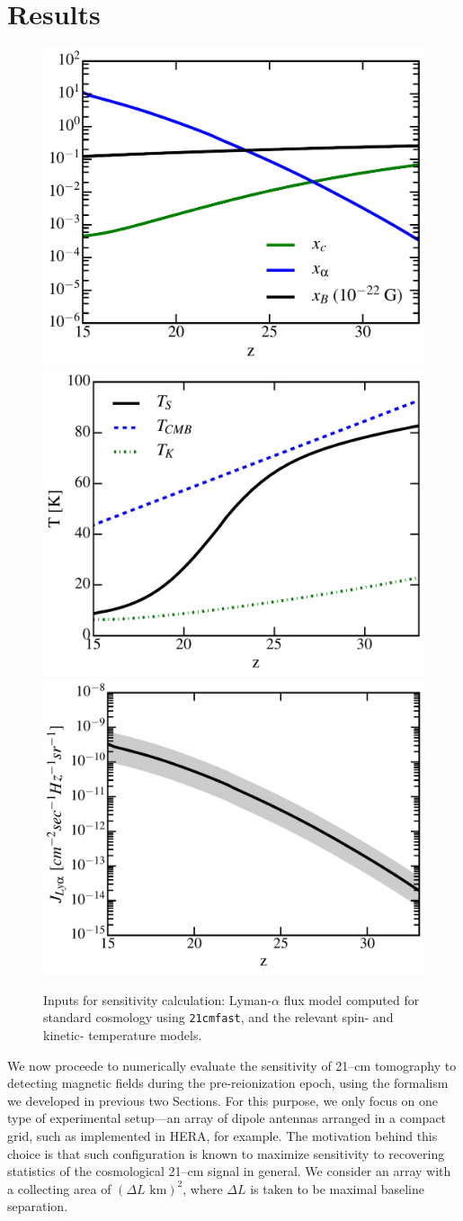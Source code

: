 \section{Results}
\label{sec:results}

\begin{figure}
\centering
\includegraphics[width=.35\textwidth,keepaspectratio=true]{xs.pdf}
\includegraphics[width=.35\textwidth,keepaspectratio=true]{Ts.pdf}
\includegraphics[width=.35\textwidth,keepaspectratio=true]{Jlya.pdf}
\caption{Inputs for sensitivity calculation: Lyman-$\alpha$ flux model computed for standard cosmology using \texttt{21cmfast}, and the relevant spin- and kinetic- temperature models. \label{fig:cosmo}}
\end{figure}
We now proceede to numerically evaluate the sensitivity of 21--cm tomography to detecting magnetic fields during the pre-reionization epoch, using the formalism we developed in previous two Sections. For this purpose, we only focus on one type of experimental setup---an array of dipole antennas arranged in a compact grid, such as implemented in HERA, for example. The motivation behind this choice is that such configuration is known to maximize sensitivity to recovering statistics of the cosmological 21--cm signal \cite{2009PhRvD..79h3530T,2015AAS...22532803D} in general. We consider an array with a collecting area of $(\Delta L\text{ km})^2$, where $\Delta L$ is taken to be maximal baseline separation.

